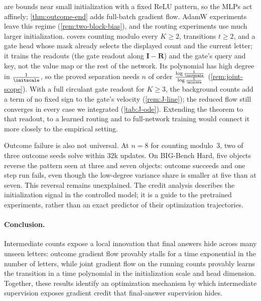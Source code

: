  are bounds near small initialization with a fixed ReLU pattern, so the MLPs act affinely;
\cref{thm:outcome-end} adds full-batch gradient flow. AdamW experiments leave this regime (\cref{rem:two-block-bias}), and the routing experiments use much
larger initialization.  covers counting modulo every $K\ge2$, transitions $t\ge2$, and a gate head whose mask already
selects the displayed count and the current letter; it trains the readouts (the gate readout along $\mathbf I-\mathbf R$) and the gate's query and key,
not the value map or the rest of the network. Its polynomial has high degree in $\frac{1}{\initscale}$, so the proved separation needs $n$ of order
$\frac{\log\frac{1}{\initscale}}{\log\frac{1}{\mixrate}}$ (\cref{rem:joint-scope}). With a full circulant gate readout for $K\ge3$, the background counts add a term of no fixed
sign to the gate's velocity (\cref{rem:J-line}); the reduced flow still converges in every case we integrated (\cref{tab:J-ode}). Extending
the theorem to that readout, to a learned routing and to full-network training would connect it more closely to the empirical setting.

Outcome failure is also not universal. At $n=8$ for counting modulo~$3$, two of three outcome seeds solve within $32$k updates.
On BIG-Bench Hard, five objects reverse the pattern seen at three and seven objects: outcome succeeds and one step run fails,
even though the low-degree variance share is smaller at five than at seven. This reversal remains unexplained.
The credit analysis describes the initialization signal in the controlled model; it is a guide to the pretrained experiments,
rather than an exact predictor of their optimization trajectories.

\paragraph{Conclusion.} Intermediate counts expose a local innovation that final answers hide across many unseen letters:
outcome gradient flow provably stalls for a time exponential in the number of letters, while joint gradient flow on the running
counts provably learns the transition in a time polynomial in the initialization scale and head dimension. Together, these results identify an optimization
mechanism by which intermediate supervision exposes gradient credit that final-answer supervision hides.